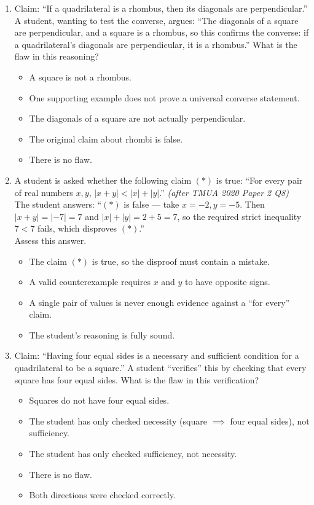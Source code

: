 \documentclass[11pt,a4paper]{article}
\begin{document}
\begin{enumerate}
\item Claim: ``If a quadrilateral is a rhombus, then its diagonals are perpendicular.'' A student, wanting to test the converse, argues: ``The diagonals of a square are perpendicular, and a square is a rhombus, so this confirms the converse: if a quadrilateral's diagonals are perpendicular, it is a rhombus.'' What is the flaw in this reasoning?
\begin{itemize}
\item[A)] A square is not a rhombus.
\item[B)] One supporting example does not prove a universal converse statement.
\item[C)] The diagonals of a square are not actually perpendicular.
\item[D)] The original claim about rhombi is false.
\item[E)] There is no flaw.
\end{itemize}

\item A student is asked whether the following claim $(*)$ is true: ``For every pair of real numbers $x,y$, $|x+y|<|x|+|y|$.'' \textit{\small(after TMUA 2020 Paper 2 Q8)}\\
The student answers: ``$(*)$ is false --- take $x=-2,y=-5$. Then $|x+y|=|-7|=7$ and $|x|+|y|=2+5=7$, so the required strict inequality $7<7$ fails, which disproves $(*)$.''\\
Assess this answer.
\begin{itemize}
\item[A)] The claim $(*)$ is true, so the disproof must contain a mistake.
\item[B)] A valid counterexample requires $x$ and $y$ to have opposite signs.
\item[C)] A single pair of values is never enough evidence against a ``for every'' claim.
\item[D)] The student's reasoning is fully sound.
\end{itemize}

\item Claim: ``Having four equal sides is a necessary and sufficient condition for a quadrilateral to be a square.'' A student ``verifies'' this by checking that every square has four equal sides. What is the flaw in this verification?
\begin{itemize}
\item[A)] Squares do not have four equal sides.
\item[B)] The student has only checked necessity (square $\implies$ four equal sides), not sufficiency.
\item[C)] The student has only checked sufficiency, not necessity.
\item[D)] There is no flaw.
\item[E)] Both directions were checked correctly.
\end{itemize}

\end{enumerate}
\end{document}
